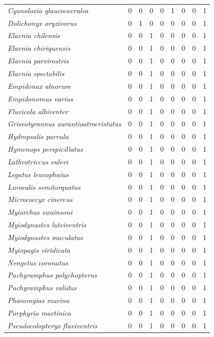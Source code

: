 \documentclass[
  oneside]{scrbook}
\begin{document}
\begin{ThreePartTable}
\begin{longtable}[t]{>{}lrrrrrlrl}
\em{Cyanoloxia glaucocaerulea} & 0 & 0 & 0 & 0 & 1 & 0 & 0 & 1\\
\em{Dolichonyx oryzivorus} & 0 & 1 & 0 & 0 & 0 & 0 & 0 & 1\\
\addlinespace
\em{Elaenia chilensis} & 0 & 0 & 1 & 0 & 0 & 0 & 0 & 1\\
\em{Elaenia chiriquensis} & 0 & 0 & 1 & 0 & 0 & 0 & 0 & 1\\
\em{Elaenia parvirostris} & 0 & 0 & 1 & 0 & 0 & 0 & 0 & 1\\
\em{Elaenia spectabilis} & 0 & 0 & 1 & 0 & 0 & 0 & 0 & 1\\
\em{Empidonax alnorum} & 0 & 0 & 1 & 0 & 0 & 0 & 0 & 1\\
\addlinespace
\em{Empidonomus varius} & 0 & 0 & 1 & 0 & 0 & 0 & 0 & 1\\
\em{Fluvicola albiventer} & 0 & 0 & 1 & 0 & 0 & 0 & 0 & 1\\
\em{Griseotyrannus aurantioatrocristatus} & 0 & 0 & 1 & 0 & 0 & 0 & 0 & 1\\
\em{Hydropsalis parvula} & 0 & 0 & 1 & 0 & 0 & 0 & 0 & 1\\
\em{Hymenops perspicillatus} & 0 & 0 & 1 & 0 & 0 & 0 & 0 & 1\\
\addlinespace
\em{Lathrotriccus euleri} & 0 & 0 & 1 & 0 & 0 & 0 & 0 & 1\\
\em{Legatus leucophaius} & 0 & 0 & 1 & 0 & 0 & 0 & 0 & 1\\
\em{Lurocalis semitorquatus} & 0 & 0 & 1 & 0 & 0 & 0 & 0 & 1\\
\em{Micrococcyx cinereus} & 0 & 0 & 1 & 0 & 0 & 0 & 0 & 1\\
\em{Myiarchus swainsoni} & 0 & 0 & 1 & 0 & 0 & 0 & 0 & 1\\
\addlinespace
\em{Myiodynastes luteiventris} & 0 & 0 & 1 & 0 & 0 & 0 & 0 & 1\\
\em{Myiodynastes maculatus} & 0 & 0 & 1 & 0 & 0 & 0 & 0 & 1\\
\em{Myiopagis viridicata} & 0 & 0 & 1 & 0 & 0 & 0 & 0 & 1\\
\em{Nengetus coronatus} & 0 & 0 & 1 & 0 & 0 & 0 & 0 & 1\\
\em{Pachyramphus polychopterus} & 0 & 0 & 1 & 0 & 0 & 0 & 0 & 1\\
\addlinespace
\em{Pachyramphus validus} & 0 & 0 & 1 & 0 & 0 & 0 & 0 & 1\\
\em{Phaeomyias murina} & 0 & 0 & 1 & 0 & 0 & 0 & 0 & 1\\
\em{Porphyrio martinica} & 0 & 0 & 1 & 0 & 0 & 0 & 0 & 1\\
\em{Pseudocolopteryx flaviventris} & 0 & 0 & 1 & 0 & 0 & 0 & 0 & 1\\

\end{longtable}
\end{ThreePartTable}
\end{document}
